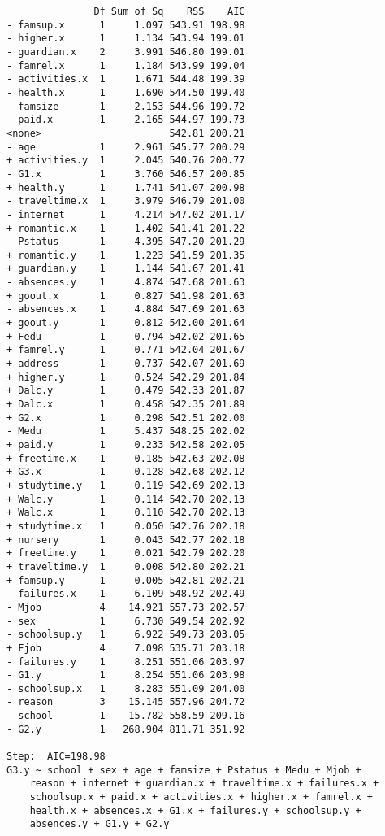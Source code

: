 \documentclass[11pt]{article}
\begin{document}
\begin{enumerate}
\begin{verbatim}
               Df Sum of Sq    RSS    AIC
- famsup.x      1     1.097 543.91 198.98
- higher.x      1     1.134 543.94 199.01
- guardian.x    2     3.991 546.80 199.01
- famrel.x      1     1.184 543.99 199.04
- activities.x  1     1.671 544.48 199.39
- health.x      1     1.690 544.50 199.40
- famsize       1     2.153 544.96 199.72
- paid.x        1     2.165 544.97 199.73
<none>                      542.81 200.21
- age           1     2.961 545.77 200.29
+ activities.y  1     2.045 540.76 200.77
- G1.x          1     3.760 546.57 200.85
+ health.y      1     1.741 541.07 200.98
- traveltime.x  1     3.979 546.79 201.00
- internet      1     4.214 547.02 201.17
+ romantic.x    1     1.402 541.41 201.22
- Pstatus       1     4.395 547.20 201.29
+ romantic.y    1     1.223 541.59 201.35
+ guardian.y    1     1.144 541.67 201.41
- absences.y    1     4.874 547.68 201.63
+ goout.x       1     0.827 541.98 201.63
- absences.x    1     4.884 547.69 201.63
+ goout.y       1     0.812 542.00 201.64
+ Fedu          1     0.794 542.02 201.65
+ famrel.y      1     0.771 542.04 201.67
+ address       1     0.737 542.07 201.69
+ higher.y      1     0.524 542.29 201.84
+ Dalc.y        1     0.479 542.33 201.87
+ Dalc.x        1     0.458 542.35 201.89
+ G2.x          1     0.298 542.51 202.00
- Medu          1     5.437 548.25 202.02
+ paid.y        1     0.233 542.58 202.05
+ freetime.x    1     0.185 542.63 202.08
+ G3.x          1     0.128 542.68 202.12
+ studytime.y   1     0.119 542.69 202.13
+ Walc.y        1     0.114 542.70 202.13
+ Walc.x        1     0.110 542.70 202.13
+ studytime.x   1     0.050 542.76 202.18
+ nursery       1     0.043 542.77 202.18
+ freetime.y    1     0.021 542.79 202.20
+ traveltime.y  1     0.008 542.80 202.21
+ famsup.y      1     0.005 542.81 202.21
- failures.x    1     6.109 548.92 202.49
- Mjob          4    14.921 557.73 202.57
- sex           1     6.730 549.54 202.92
- schoolsup.y   1     6.922 549.73 203.05
+ Fjob          4     7.098 535.71 203.18
- failures.y    1     8.251 551.06 203.97
- G1.y          1     8.254 551.06 203.98
- schoolsup.x   1     8.283 551.09 204.00
- reason        3    15.145 557.96 204.72
- school        1    15.782 558.59 209.16
- G2.y          1   268.904 811.71 351.92

Step:  AIC=198.98
G3.y ~ school + sex + age + famsize + Pstatus + Medu + Mjob + 
    reason + internet + guardian.x + traveltime.x + failures.x + 
    schoolsup.x + paid.x + activities.x + higher.x + famrel.x + 
    health.x + absences.x + G1.x + failures.y + schoolsup.y + 
    absences.y + G1.y + G2.y


\end{verbatim}
\end{enumerate}
\end{document}
